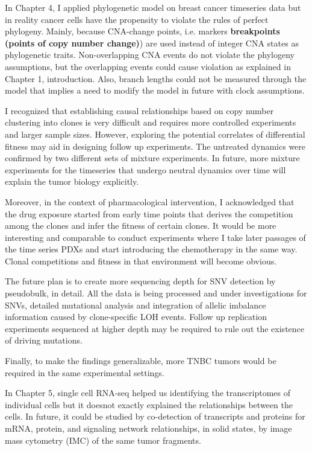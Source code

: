 In Chapter 4, I applied phylogenetic model on breast cancer timeseries data but in reality cancer cells have the propensity to violate the rules of perfect phylogeny. Mainly, because CNA-change points, i.e. markers \textbf{breakpoints (points of copy number change)}) are used instead of integer CNA states as phylogenetic traits. Non-overlapping CNA events do not violate the phylogeny assumptions, but the overlapping events could cause violation as explained in Chapter 1, introduction. Also, branch lengths could not be measured through the model that implies a need to modify the model in future with clock assumptions.

I recognized that establishing causal relationships based on copy number clustering into clones is very difficult and requires more controlled experiments and larger sample sizes. However, exploring the potential correlates of differential fitness may aid in designing follow up experiments. The untreated dynamics were confirmed by two different sets of mixture experiments. In future, more mixture experiments for the timeseries that undergo neutral dynamics over time will explain the tumor biology explicitly. 

Moreover, in the context of pharmacological intervention, I acknowledged that the drug exposure started from early time points that derives the competition among the clones and infer the fitness of certain clones. It would be more interesting and comparable to conduct experiments where I take later passages of the time series PDXs and start introducing the chemotherapy in the same way. Clonal competitions and fitness in that environment will become obvious.

The future plan is to create more sequencing depth for SNV detection by pseudobulk, in detail. All the data is being processed and under investigations for SNVs, detailed mutational analysis and integration of allelic imbalance information caused by clone-specific \ac{LOH} events. Follow up replication experiments sequenced at higher depth may be required to rule out the existence of driving mutations. 

Finally, to make the findings generalizable, more TNBC tumors would be required in the same experimental settings.


In Chapter 5, single cell RNA-seq helped us identifying the transcriptomes of individual cells but it doesnot exactly explained the relationships between the cells. In future, it could be studied by co-detection of transcripts and proteins for mRNA, protein, and signaling network relationships, in solid states, by image mass cytometry (IMC) of the same tumor fragments.


